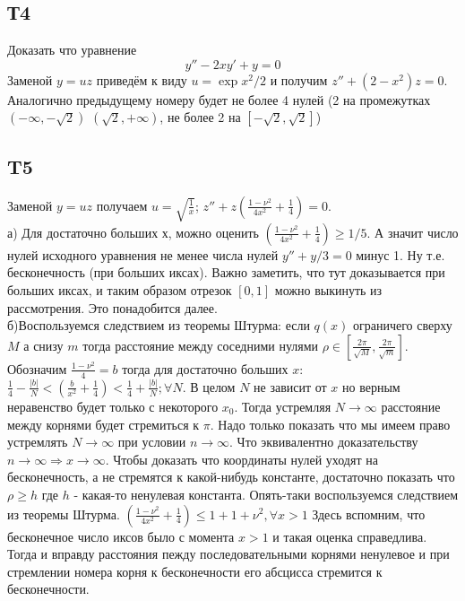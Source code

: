 \documentclass{article}
\begin{document}
\subsection{Т4}
Доказать что уравнение 
\begin{equation}
    y''-2x y' +y=0
\end{equation}
Заменой $y=uz$ приведём к виду $u=\exp{x^2/2}$ и получим $z''+(2-x^2)z=0$. Аналогично предыдущему номеру будет не более 4 нулей (2 на промежутках $(-\infty, -\sqrt2)$ $(\sqrt2,+\infty)$, не более 2 на $[-\sqrt 2, \sqrt 2]$)
\subsection{T5}
Заменой $y=uz$ получаем $u=\sqrt{\frac{1}{x}}$; $z''+z \left( \frac{1-\nu^2}{4x^2}+\frac{1}{4} \right)=0$. \\
а) Для достаточно больших х, можно оценить $\left( \frac{1-\nu^2}{4x^2}+\frac{1}{4} \right) \geq 1/5$. А значит число нулей исходного уравнения не менее числа нулей $y''+y/3=0$ минус 1. Ну т.е. бесконечность (при больших иксах). Важно заметить, что тут доказывается при больших иксах, и таким образом отрезок $[0,1]$ можно выкинуть из рассмотрения. Это понадобится далее.\\
б)Воспользуемся следствием из теоремы Штурма: если $q(x)$ ограничего сверху $M$ а снизу $m$ тогда расстояние между соседними нулями $\rho \in [\frac{2 \pi}{\sqrt M}, \frac{2 \pi}{\sqrt m}]$.  Обозначим $\frac{1-\nu^2}{4}=b$ тогда для достаточно больших $x$: $\frac{1}{4}-\frac{|b|}{N} < \left( \frac{b}{x^2}+\frac{1}{4} \right)< \frac{1}{4}+\frac{|b|}{N}; \forall N$. В целом $N$ не зависит от $x$ но верным неравенство будет только с некоторого $x_0$. Тогда устремляя $N \rightarrow \infty$ расстояние между корнями будет стремиться к $\pi$. Надо только показать что мы имеем право устремлять $N \rightarrow \infty$ при условии $n \rightarrow \infty$. Что эквивалентно доказательству $n \rightarrow \infty \Rightarrow x \rightarrow \infty$. Чтобы доказать что координаты нулей уходят на бесконечность, а не стремятся к какой-нибудь константе, достаточно показать что $\rho \geq h$ где $h$ - какая-то ненулевая константа. Опять-таки воспользуемся следствием из теоремы Штурма. $\left( \frac{1-\nu^2}{4x^2}+\frac{1}{4} \right) \leq 1 + 1+\nu^2, \forall x>1$ Здесь вспомним, что бесконечное число иксов было с момента $x>1$ и такая оценка справедлива. Тогда и вправду расстояния пежду последовательными корнями ненулевое и при стремлении номера корня к бесконечности его абсцисса стремится к бесконечности.
\end{document}
